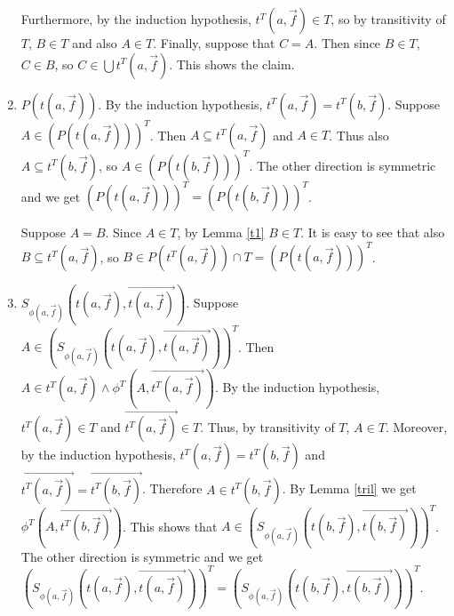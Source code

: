 \documentclass{LMCS}
\begin{document}
\begin{enumerate}[$\bullet$]
Furthermore, by the induction hypothesis, $t^T(a, \vec{f}) \in T$, 
so by transitivity of $T$, $B \in T$ and also $A \in T$. Finally, 
suppose that $C = A$. Then since $B \in T$, $C \in B$, so $C \in \bigcup t^T(a,
\vec{f})$. This shows the claim. 
\item $P(t(a, \vec{f}))$. By the induction hypothesis, $t^T(a, \vec{f}) =
t^T(b, \vec{f})$. Suppose $A \in (P(t(a, \vec{f})))^T$. Then $A \subseteq
t^T(a, \vec{f})$ and $A \in T$. Thus also $A \subseteq t^T(b, \vec{f})$, so $A
\in (P(t(b, \vec{f})))^T$. The other direction is symmetric and we get $
(P(t(a, \vec{f})))^T = (P(t(b, \vec{f})))^T$. 

Suppose $A = B$. Since $A \in T$, by Lemma \ref{t1} $B \in T$. 
It is easy to see that also $B \subseteq t^T(a, \vec{f})$, so $B \in P(t^T(a,
\vec{f})) \cap T = (P(t(a, \vec{f})))^T$.
\item $S_{\phi(a, \vec{f})}(t(a, \vec{f}), \overrightarrow{t(a, \vec{f})})$. Suppose $A \in
(S_{\phi(a, \vec{f})}(t(a, \vec{f}), \overrightarrow{t(a, \vec{f})}))^T$. Then
$A \in t^T(a, \vec{f}) \land \phi^T(A, \overrightarrow{t^T(a, \vec{f})})$.
By the induction hypothesis, $t^T(a, \vec{f}) \in T$ and
$\overrightarrow{t^T(a, \vec{f})} \in T$. Thus, by transitivity of $T$, $A \in T$.
Moreover, by the induction hypothesis, $t^T(a, \vec{f}) = t^T(b, \vec{f})$ and
$\overrightarrow{t^T(a, \vec{f})} = \overrightarrow{t^T(b, \vec{f})}$. Therefore $A \in t^T(b,
\vec{f})$. By Lemma \ref{tril} we get $\phi^T(A, \overrightarrow{t^T(b, \vec{f})})$. This shows
that $A \in (S_{\phi(a, \vec{f})}(t(b, \vec{f}), \overrightarrow{t(b, \vec{f})}))^T$. The
other direction is symmetric and we get $
(S_{\phi(a, \vec{f})}(t(a, \vec{f}), \overrightarrow{t(a, \vec{f})}))^T =
(S_{\phi(a, \vec{f})}(t(b, \vec{f}), \overrightarrow{t(b, \vec{f})}))^T$. 


\end{enumerate}
\end{document}
